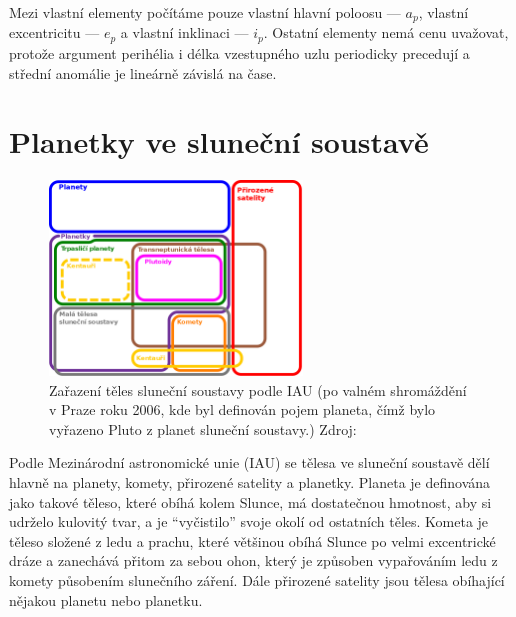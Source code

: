 \documentclass[A4paper, 12pt, oneside]{book}
\begin{document}
Mezi vlastní elementy počítáme pouze vlastní hlavní poloosu --- $a_p$, vlastní excentricitu --- $e_p$ a vlastní inklinaci --- $i_p$. Ostatní elementy nemá cenu uvažovat, protože argument perihélia i délka vzestupného uzlu periodicky precedují a střední anomálie je lineárně závislá na čase.

\chapter{Planetky ve sluneční soustavě}
\begin{figure}[!htb]
	\centering
	\includegraphics[width=0.6\textwidth]{obr/ssb.png}
	\caption{Zařazení těles sluneční soustavy podle IAU (po valném shromáždění v Praze roku 2006, kde byl definován pojem planeta, čímž bylo vyřazeno Pluto z planet sluneční soustavy.) Zdroj: \cite{wiki:ssb} \label{fig:ssb}}
\end{figure}

Podle Mezinárodní astronomické unie (IAU) se tělesa ve sluneční soustavě dělí hlavně na planety, komety, přirozené satelity a planetky. Planeta je definována jako takové těleso, které obíhá kolem Slunce, má dostatečnou hmotnost, aby si udrželo kulovitý tvar, a je \enquote{vyčistilo} svoje okolí od ostatních těles. Kometa je těleso složené z ledu a prachu, které většinou obíhá Slunce po velmi excentrické dráze a zanechává přitom za sebou ohon, který je způsoben vypařováním ledu z komety působením slunečního záření. Dále přirozené satelity jsou tělesa obíhající nějakou planetu nebo planetku. 
\end{document}
